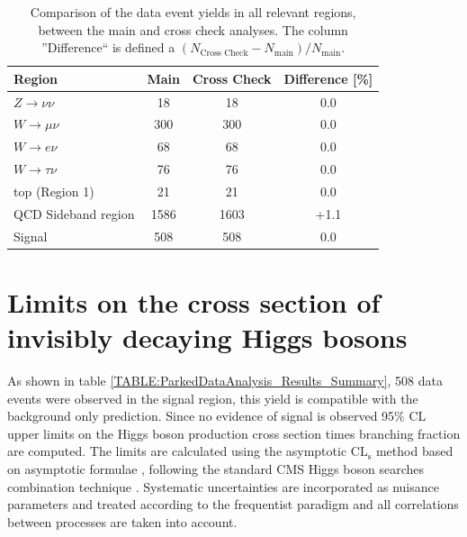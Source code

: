 \begin{table}[!htb]
\centering
\begin{tabular}{|l|c|c|c|}
\hline
Region                & Main & Cross Check & Difference [\%] \\
\hline\hline
$Z\rightarrow\nu\nu$  &   18 &          18 &             0.0 \\
$W\rightarrow\mu\nu$  &  300 &         300 &             0.0 \\
$W\rightarrow e\nu$   &   68 &          68 &             0.0 \\
$W\rightarrow\tau\nu$ &   76 &          76 &             0.0 \\
top (Region 1)        &   21 &          21 &             0.0 \\
QCD Sideband region   & 1586 &        1603 &            +1.1 \\
\hline\hline
Signal                &  508 &         508 &             0.0 \\
\hline
\end{tabular}
\caption{Comparison of the data event yields in all relevant regions, between the main and cross check analyses. The column ''Difference`` is defined a $(N_{\text{Cross Check}}-N_{\text{main}})/N_{\text{main}}$.}
\label{TABLE:ParkedDataAnalysis_Results_MainCrossCheckComparison}
\end{table}

\section{Limits on the cross section of invisibly decaying Higgs bosons}
\label{SECTION:ParkedDataAnalysis_Limits}


As shown in table \ref{TABLE:ParkedDataAnalysis_Results_Summary}, 508 data events were observed in the signal region, this yield is compatible with the background only prediction. Since no evidence of signal is observed 95\% \gls{CL} upper limits on the Higgs boson production cross section times branching fraction are computed. The limits are calculated using the asymptotic $\mathrm{CL}_\mathrm{s}$ method \cite{ARTICLE:CLsTechnique,ARTICLE:CLCompForCombiningSearchesWithSmallStat,ARTICLE:HandbookofLHCHiggsCrossSectionsDifferentialDistributions} based on asymptotic formulae \cite{ARTICLE:AsymptoticCLS}, following the standard \gls{CMS} Higgs boson searches combination technique \cite{ARTICLE:CMS_HiggsDiscovery,ARTICLE:HiggsCombination}. Systematic uncertainties are incorporated as nuisance parameters and treated according to the frequentist paradigm \cite{ARTICLE:HiggsCombination} and all correlations between processes are taken into account.


